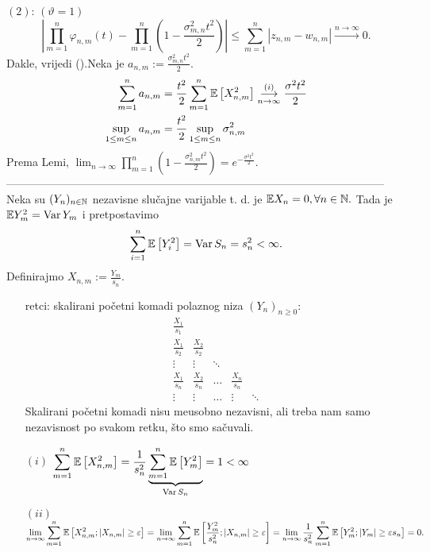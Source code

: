 \documentclass{article}
\newcommand{\Var}{\operatorname{Var}}
\begin{document}
\((2)\): \((\vartheta=1)\) \[\left|\prod_{m=1}^n\varphi_{n,m}(t)-\prod_{m=1}^n\left(1-\frac{\sigma_{m,n}^2t^2}2\right)\right|\le\sum_{m=1}^n|z_{n,m}-w_{n,m}|\overset{n\to\infty}{\longrightarrow}0.\] Dakle, vrijedi ().\newline\newline Neka je \(a_{n,m}:=\frac{\sigma_{m,n}^2t^2}2.\) \[\begin{aligned}\sum_{m=1}^na_{n,m}&=\frac{t^2}2\sum_{m=1}^n\Bbb E\left[X_{n,m}^2\right]\overset{(i)}{\underset{n\to\infty}{\longrightarrow}}\frac{\sigma^2t^2}2\\\sup_{1\le m\le n}a_{n,m}&=\frac{t^2}2\sup_{1\le m\le n}\sigma_{n,m}^2\end{aligned}\] Prema Lemi, \(\displaystyle\lim_{n\to\infty}\prod_{m=1}^n\left(1-\frac{\sigma_{n,m}^2t^2}2\right)=e^{-\frac{\sigma^2t^2}2}.\)\newline\newline------------------------------------------------------------------------------------------------------\newline\newline
Neka su \((Y_n)_{n\in\Bbb N}\) nezavisne slučajne varijable t. d. je \(\Bbb EX_n=0,\forall n\in\Bbb N.\) Tada je \(\Bbb EY_m^2=\Var Y_m\) i pretpostavimo \[\sum_{i=1}^n\Bbb E\left[Y_i^2\right]=\Var S_n=s_n^2<\infty.\] Definirajmo \(X_{n,m}:=\frac{Y_m}{s_n}.\)\begin{enumerate}
    \item[\ding{228}] retci: skalirani početni komadi polaznog niza \((Y_n)_{n\ge0}\): \[\begin{matrix}\frac{X_1}{s_1}&&&&\\\frac{X_1}{s_2}&\frac{X_2}{s_2}&&&\\\vdots&\vdots&\ddots&\\\frac{X_1}{s_n}&\frac{X_2}{s_n}&\ldots&\frac{X_n}{s_n}\\\vdots&\vdots&\ldots&\vdots&\ddots\end{matrix}\] Skalirani početni komadi nisu me\dj{}usobno nezavisni, ali treba nam samo nezavisnost po svakom retku, što smo sačuvali.
    \item[\((i)\)] \(\displaystyle\sum_{m=1}^n\Bbb E\left[X_{n,m}^2\right]=\frac1{s_n^2}\underbrace{\sum_{m=1}^n\Bbb E\left[Y_m^2\right]}_{\Var S_n}=1<\infty\) \checkmark 
    \item[\((ii)\)] \(\displaystyle\lim_{n\to\infty}\sum_{m=1}^n\Bbb E\left[X_{n,m}^2;|X_{n,m}|\ge\varepsilon\right]=\lim_{n\to\infty}\sum_{m=1}^n\Bbb E\left[\frac{Y_m^2}{s_n^2};|X_{n,m}|\ge\varepsilon\right]=\lim_{n\to\infty}\frac1{s_n^2}\sum_{m=1}^n\Bbb E\left[Y_m^2;|Y_m|\ge\varepsilon s_n\right]=0.\)
\end{enumerate} 
\end{document}
